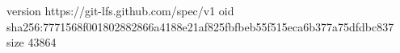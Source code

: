 version https://git-lfs.github.com/spec/v1
oid sha256:7771568f001802882866a4188e21af825fbfbeb55f515eca6b377a75dfdbc837
size 43864
